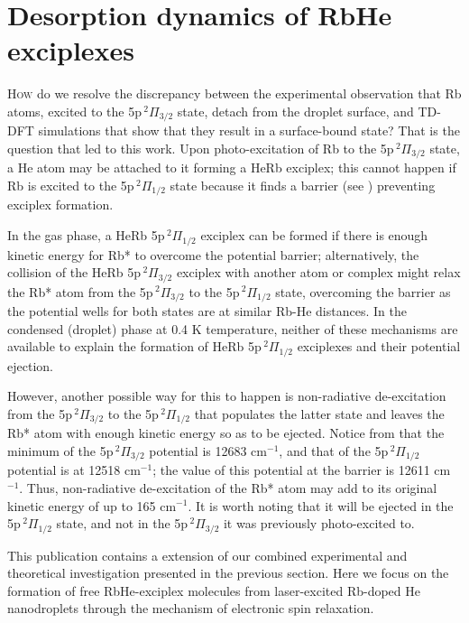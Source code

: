 \chapter{Desorption dynamics of RbHe exciplexes}\label{ch:rbhe-exciplexe}
	\lettrine[lines=4]{\color{activeColor}H}{ow} do we resolve the discrepancy between the experimental observation that Rb atoms, excited to the 5p$\,^2\Pi_{3/2}$ state, detach from the droplet surface, and TD-DFT simulations that show that they result in a surface-bound state? That is the question that led to this work. Upon photo-excitation of Rb to the 5p$\,^2\Pi_{3/2}$ state, a He atom may be attached to it forming a HeRb exciplex; this cannot happen if Rb is excited to the 5p$\,^2\Pi_{1/2}$ state because it finds a barrier (see ) preventing exciplex formation.

	In the gas phase, a HeRb 5p$\,^2\Pi_{1/2}$ exciplex can be formed if there is enough kinetic energy for Rb* to overcome the potential barrier; alternatively, the collision of the HeRb 5p$\,^2\Pi_{3/2}$ exciplex with another atom or complex might relax the Rb* atom from the 5p$\,^2\Pi_{3/2}$ to the 5p$\,^2\Pi_{1/2}$ state, overcoming the barrier as the potential wells for both states are at similar Rb-He distances. In the condensed (droplet) phase at 0.4 K temperature, neither of these mechanisms are available to explain the formation of HeRb 5p$\,^2\Pi_{1/2}$ exciplexes and their potential ejection.

	However, another possible way for this to happen is non-radiative de-excitation from the 5p$\,^2\Pi_{3/2}$ to the 5p$\,^2\Pi_{1/2}$ that populates the latter state and leaves the Rb* atom with enough kinetic energy so as to be ejected. Notice from  that the minimum of the 5p$\,^2\Pi_{3/2}$ potential is 12683 cm$^{-1}$, and that of the 5p$\,^2\Pi_{1/2}$ potential is at 12518 cm$^{-1}$; the value of this potential at the barrier is 12611 cm$^{-1}$. Thus, non-radiative de-excitation of the Rb* atom may add to its original kinetic energy of up to 165 cm$^{-1}$. It is worth noting that it will be ejected in the 5p$\,^2\Pi_{1/2}$ state, and not in the 5p$\,^2\Pi_{3/2}$ it was previously photo-excited to.

	This publication contains a extension of our combined experimental and theoretical investigation presented in the previous section. Here we focus on the formation of free RbHe-exciplex molecules from laser-excited Rb-doped He nanodroplets through the mechanism of electronic spin relaxation.%

